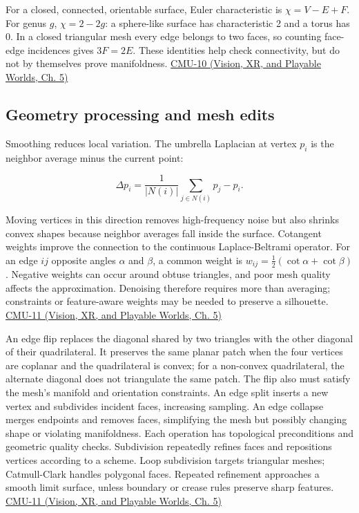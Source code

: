 For a closed, connected, orientable surface, Euler characteristic is \(\chi=V-E+F\). For genus \(g\), \(\chi=2-2g\): a sphere-like surface has characteristic 2 and a torus has 0. In a closed triangular mesh every edge belongs to two faces, so counting face-edge incidences gives \(3F=2E\). These identities help check connectivity, but do not by themselves prove manifoldness. \href{../07-Vision-XR-and-Playable-Worlds/main.pdf\#nameddest=04-visual-computing-ii-ch036-cmu-10---meshes-and-manifolds}{CMU-10 (Vision, XR, and Playable Worlds, Ch. 5)}

\subsection{Geometry processing and mesh edits}\label{03-visual-computing-i-ch002-geometry-processing-and-mesh-edits}

Smoothing reduces local variation. The umbrella Laplacian at vertex \(p_i\) is the neighbor average minus the current point:

\[
\Delta p_i=\frac1{|N(i)|}\sum_{j\in N(i)}p_j-p_i.
\]

Moving vertices in this direction removes high-frequency noise but also shrinks convex shapes because neighbor averages fall inside the surface. Cotangent weights improve the connection to the continuous Laplace-Beltrami operator. For an edge \(ij\) opposite angles \(\alpha\) and \(\beta\), a common weight is \(w_{ij}=\tfrac12(\cot\alpha+\cot\beta)\). Negative weights can occur around obtuse triangles, and poor mesh quality affects the approximation. Denoising therefore requires more than averaging; constraints or feature-aware weights may be needed to preserve a silhouette. \href{../07-Vision-XR-and-Playable-Worlds/main.pdf\#nameddest=04-visual-computing-ii-ch036-cmu-11---digital-geometry-processing}{CMU-11 (Vision, XR, and Playable Worlds, Ch. 5)}

An edge flip replaces the diagonal shared by two triangles with the other diagonal of their quadrilateral. It preserves the same planar patch when the four vertices are coplanar and the quadrilateral is convex; for a non-convex quadrilateral, the alternate diagonal does not triangulate the same patch. The flip also must satisfy the mesh's manifold and orientation constraints. An edge split inserts a new vertex and subdivides incident faces, increasing sampling. An edge collapse merges endpoints and removes faces, simplifying the mesh but possibly changing shape or violating manifoldness. Each operation has topological preconditions and geometric quality checks. Subdivision repeatedly refines faces and repositions vertices according to a scheme. Loop subdivision targets triangular meshes; Catmull-Clark handles polygonal faces. Repeated refinement approaches a smooth limit surface, unless boundary or crease rules preserve sharp features. \href{../07-Vision-XR-and-Playable-Worlds/main.pdf\#nameddest=04-visual-computing-ii-ch036-cmu-11---digital-geometry-processing}{CMU-11 (Vision, XR, and Playable Worlds, Ch. 5)}

